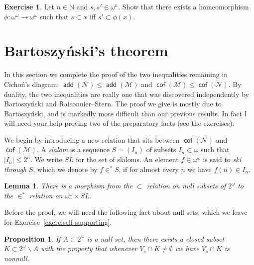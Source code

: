 \documentclass[11pt,oneside]{amsbook}
\newcommand{\NN}{\mathbb N}
\newcommand{\Null}{\mathcal N}
\newcommand{\Meager}{\mathcal M}
\DeclareMathOperator{\add}{\mathsf{add}}
\DeclareMathOperator{\cof}{\mathsf{cof}}
\theoremstyle{definition}
\newtheorem{exerc}{Exercise}[section]
\theoremstyle{plain}
\newtheorem{lem}[thm]{Lemma}
\newtheorem{prop}[thm]{Proposition}
\theoremstyle{definition}
\theoremstyle{remark}
\begin{document}
\begin{exerc}
  \label{exerc:homeo}
  Let $n\in\NN$ and $s,s'\in\omega^n$. Show that there exists a homeomorphism $\phi\colon\omega^\omega\to\omega^\omega$ such that $s\subset x$ iff $s'\subset\phi(x)$.
\end{exerc}



\section{Bartoszy\'nski's theorem}

In this section we complete the proof of the two inequalities remaining in Cicho\'n's diagram: $\add(\Null)\leq\add(\Meager)$ and $\cof(\Meager)\leq\cof(\Null)$. By duality, the two inequalities are really one that was discovered independently by Bartoszy\'nski and Raisonnier--Stern. The proof we give is mostly due to Bartoszy\'nski, and is markedly more difficult than our previous results. In fact I will need your help proving two of the preparatory facts (see the exercises).

We begin by introducing a new relation that sits between $\cof(\Null)$ and $\cof(\Meager)$. A \emph{slalom} is a sequence $S=(I_n)$ of subsets $I_n\subset\omega$ such that $|I_n|\leq2^n$. We write $SL$ for the set of slaloms. An element $f\in\omega^\omega$ is said to \emph{ski through} $S$, which we denote by $f\in^*S$, if for almost every $n$ we have $f(n)\in I_n$.

\begin{lem}
  \label{lem:null-slalom}
  There is a morphism from the $\subset$ relation on null subsets of $2^\omega$ to the $\in^*$ relation on $\omega^\omega\times SL$.
\end{lem}

Before the proof, we will need the following fact about null sets, which we leave for Exercise~\ref{exerc:self-supporting}.

\begin{prop}
  \label{prop:self-supporting}
  If $A\subset2^\omega$ is a null set, then there exists a closed subset $K\subset2^\omega\smallsetminus A$ with the property that whenever $V_s\cap K\neq\emptyset$ we have $V_s\cap K$ is nonnull.
\end{prop}
\end{document}
